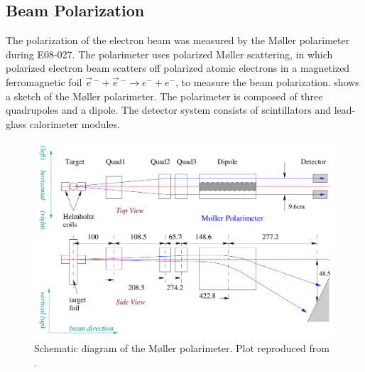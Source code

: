 \subsection{Beam Polarization}
\label{C5S2SS4}

The polarization of the electron beam was measured by the M{\o}ller polarimeter \cite{MOLLER,Alcorn2004} during E08-027. The polarimeter uses polarized M{\o}ller scattering, in which polarized electron beam scatters off polarized atomic electrons in a magnetized ferromagnetic foil $\vec{e}\,^-+\vec{e}\,^-\rightarrow e^-+e^-$, to measure the beam polarization.  shows a sketch of the M{\o}ller polarimeter. The polarimeter is composed of three quadrupoles and a dipole. The detector system consists of scintillators and lead-glass calorimeter modules.

\begin{figure}[b!]
  \centering
  \includegraphics[width=\textwidth]{figs/moller.pdf}
  \caption[Schematic diagram of the M{\o}ller polarimeter.]{Schematic diagram of the M{\o}ller polarimeter. Plot reproduced from \cite{Zheng2002}. \label{C5S2SS4F1}}
\end{figure}

